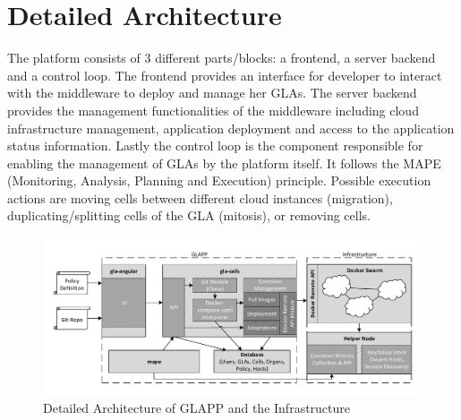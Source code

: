 \documentclass{seal_thesis}
\begin{document}
\section{Detailed Architecture}\label{sec:detailedArchitecture}
The platform consists of 3 different parts/blocks: a frontend, a server backend and a control loop.
The frontend provides an interface for developer to interact with the middleware to deploy and manage her GLAs.
The server backend provides the management functionalities of the middleware including cloud infrastructure management, application deployment and access to the application status information.
Lastly the control loop is the component responsible for enabling the management of GLAs by the platform itself.
It follows the MAPE (Monitoring, Analysis, Planning and Execution) principle.
Possible execution actions are moving cells between different cloud instances (migration), duplicating/splitting cells of the GLA (mitosis), or removing cells.

\begin{figure}[!ht]
\centering
	\includegraphics[width=\textwidth]{detailed_architecture.pdf}
	\caption{Detailed Architecture of GLAPP and the Infrastructure}
	\label{fig:detailed}
\end{figure}
\end{document}
